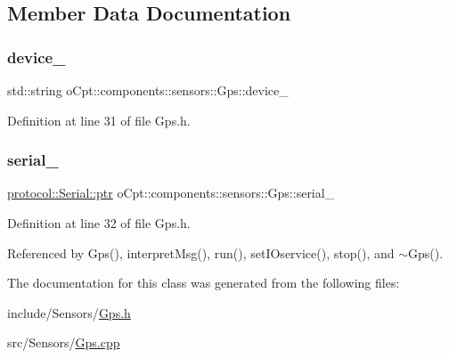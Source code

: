 \subsection{Member Data Documentation}
\hypertarget{classo_cpt_1_1components_1_1sensors_1_1_gps_a6b8c50dca0776870cedabbb527b2144e}{}\label{classo_cpt_1_1components_1_1sensors_1_1_gps_a6b8c50dca0776870cedabbb527b2144e} 
\subsubsection{\texorpdfstring{device\+\_\+}{device\_}}
{\footnotesize\ttfamily std\+::string o\+Cpt\+::components\+::sensors\+::\+Gps\+::device\+\_\+\hspace{0.3cm}{\ttfamily [protected]}}



Definition at line 31 of file Gps.\+h.

\hypertarget{classo_cpt_1_1components_1_1sensors_1_1_gps_a42ea2d37ec01473e92be6ef3cda6de39}{}\label{classo_cpt_1_1components_1_1sensors_1_1_gps_a42ea2d37ec01473e92be6ef3cda6de39} 
\subsubsection{\texorpdfstring{serial\+\_\+}{serial\_}}
{\footnotesize\ttfamily \hyperlink{classo_cpt_1_1protocol_1_1_serial_a4c97c6a2456d649974e07a186f634780}{protocol\+::\+Serial\+::ptr} o\+Cpt\+::components\+::sensors\+::\+Gps\+::serial\+\_\+\hspace{0.3cm}{\ttfamily [protected]}}



Definition at line 32 of file Gps.\+h.



Referenced by Gps(), interpret\+Msg(), run(), set\+I\+Oservice(), stop(), and $\sim$\+Gps().



The documentation for this class was generated from the following files\+:\begin{DoxyCompactItemize}
\item 
include/\+Sensors/\hyperlink{_gps_8h}{Gps.\+h}\item 
src/\+Sensors/\hyperlink{_gps_8cpp}{Gps.\+cpp}\end{DoxyCompactItemize}
